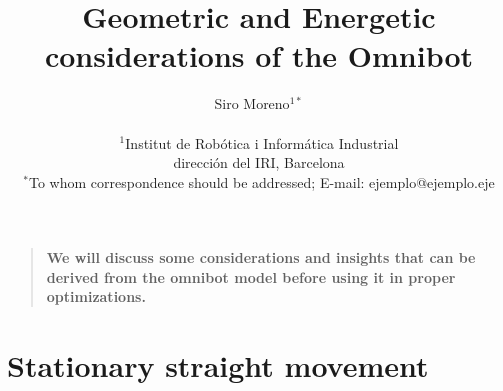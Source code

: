 \documentclass[12pt]{article}
\title{Geometric and Energetic considerations of the Omnibot}
\author
{Siro Moreno$^{1\ast}$ \\
\\
\normalsize{$^{1}$Institut de Robótica i Informática Industrial}\\
\normalsize{dirección del IRI, Barcelona}\\
\normalsize{$^\ast$To whom correspondence should be addressed; E-mail:  ejemplo@ejemplo.eje}
}
\date{}
\newenvironment{sciabstract}{%
\begin{quote} \bf}
{\end{quote}}
\begin{document}
 


\baselineskip24pt


\maketitle 




\begin{sciabstract}
  We will discuss some considerations and insights that can be derived from the omnibot model before using it in proper optimizations.
\end{sciabstract}




\section*{Stationary straight movement}
\end{document}
